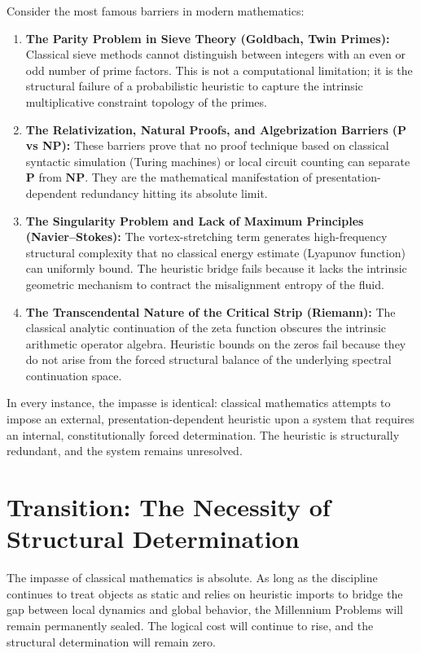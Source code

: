 \documentclass[12pt,openany]{extbook}
\theoremstyle{plain}
\theoremstyle{definition}
\begin{document}
Consider the most famous barriers in modern mathematics:
\begin{enumerate}
    \item \textbf{The Parity Problem in Sieve Theory (Goldbach, Twin Primes):} Classical sieve methods cannot distinguish between integers with an even or odd number of prime factors. This is not a computational limitation; it is the structural failure of a probabilistic heuristic to capture the intrinsic multiplicative constraint topology of the primes.
    \item \textbf{The Relativization, Natural Proofs, and Algebrization Barriers (P vs NP):} These barriers prove that no proof technique based on classical syntactic simulation (Turing machines) or local circuit counting can separate $\mathbf{P}$ from $\mathbf{NP}$. They are the mathematical manifestation of presentation-dependent redundancy hitting its absolute limit.
    \item \textbf{The Singularity Problem and Lack of Maximum Principles (Navier--Stokes):} The vortex-stretching term generates high-frequency structural complexity that no classical energy estimate (Lyapunov function) can uniformly bound. The heuristic bridge fails because it lacks the intrinsic geometric mechanism to contract the misalignment entropy of the fluid.
    \item \textbf{The Transcendental Nature of the Critical Strip (Riemann):} The classical analytic continuation of the zeta function obscures the intrinsic arithmetic operator algebra. Heuristic bounds on the zeros fail because they do not arise from the forced structural balance of the underlying spectral continuation space.
\end{enumerate}

In every instance, the impasse is identical: classical mathematics attempts to impose an external, presentation-dependent heuristic upon a system that requires an internal, constitutionally forced determination. The heuristic is structurally redundant, and the system remains unresolved.

\section{Transition: The Necessity of Structural Determination}

The impasse of classical mathematics is absolute. As long as the discipline continues to treat objects as static and relies on heuristic imports to bridge the gap between local dynamics and global behavior, the Millennium Problems will remain permanently sealed. The logical cost will continue to rise, and the structural determination will remain zero.
\end{document}
